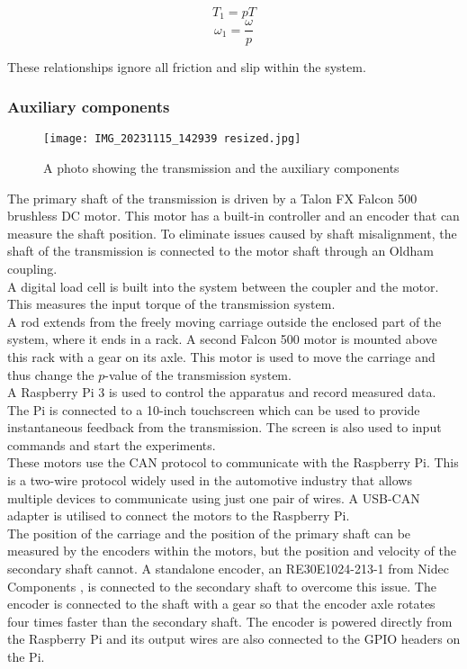 \documentclass[12pt]{article}
\begin{document}
$$T_1=pT$$
$$\omega_1=\frac{\omega}{p}$$

These relationships ignore all friction and slip within the system.

\subsubsection{Auxiliary components}
\begin{figure}
    \centering
    \texttt{[image: IMG\_20231115\_142939 resized.jpg]}
    \caption{A photo showing the transmission and the auxiliary components}
    \label{fig:photo}
\end{figure}

The primary shaft of the transmission is driven by a Talon FX Falcon 500 brushless DC motor. This motor has a built-in controller and an encoder that can measure the shaft position. To eliminate issues caused by shaft misalignment, the shaft of the transmission is connected to the motor shaft through an Oldham coupling.\\ 

A digital load cell is built into the system between the coupler and the motor. This measures the input torque of the transmission system.\\

A rod extends from the freely moving carriage outside the enclosed part of the system, where it ends in a rack. A second Falcon 500 motor is mounted above this rack with a gear on its axle. This motor is used to move the carriage and thus change the $p$-value of the transmission system.\\

A Raspberry Pi 3 is used to control the apparatus and record measured data. The Pi is connected to a 10-inch touchscreen which can be used to provide instantaneous feedback from the transmission. The screen is also used to input commands and start the experiments.\\

These motors use the CAN protocol to communicate with the Raspberry Pi. This is a two-wire protocol widely used in the automotive industry that allows multiple devices to communicate using just one pair of wires. A USB-CAN adapter is utilised to connect the motors to the Raspberry Pi.\\

The position of the carriage and the position of the primary shaft can be measured by the encoders within the motors, but the position and velocity of the secondary shaft cannot. A standalone encoder, an RE30E1024-213-1 from Nidec Components \cite{encoder}, is connected to the secondary shaft to overcome this issue. The encoder is connected to the shaft with a gear so that the encoder axle rotates four times faster than the secondary shaft. The encoder is powered directly from the Raspberry Pi and its output wires are also connected to the GPIO headers on the Pi.\\
\end{document}
